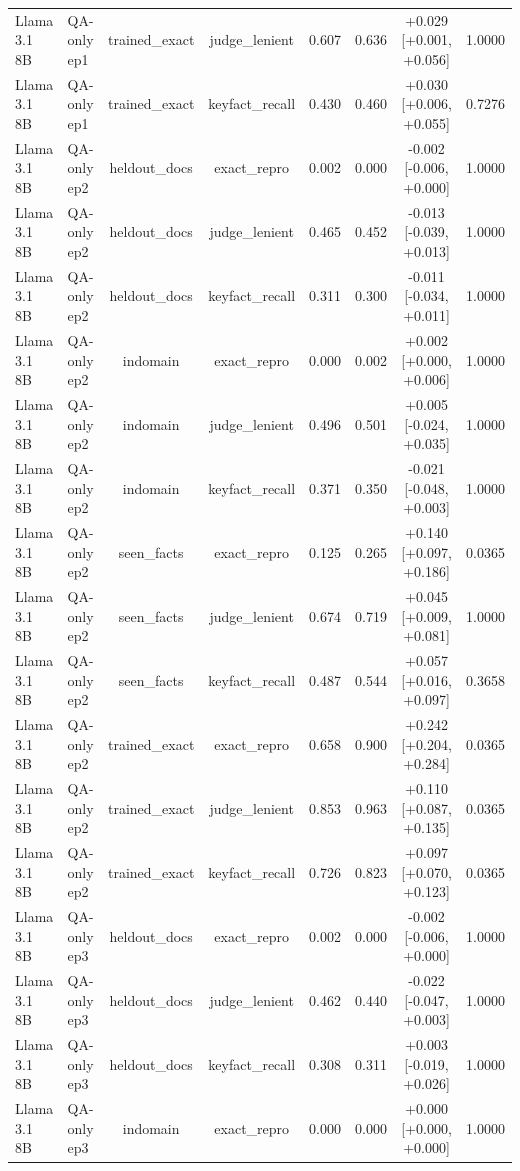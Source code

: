 \begin{table}[t]
{\begin{tabular}{llcccccc}
Llama 3.1 8B & QA-only ep1 & trained\_exact & judge\_lenient & 0.607 & 0.636 & +0.029 [+0.001, +0.056] & 1.0000 \\
Llama 3.1 8B & QA-only ep1 & trained\_exact & keyfact\_recall & 0.430 & 0.460 & +0.030 [+0.006, +0.055] & 0.7276 \\
Llama 3.1 8B & QA-only ep2 & heldout\_docs & exact\_repro & 0.002 & 0.000 & -0.002 [-0.006, +0.000] & 1.0000 \\
Llama 3.1 8B & QA-only ep2 & heldout\_docs & judge\_lenient & 0.465 & 0.452 & -0.013 [-0.039, +0.013] & 1.0000 \\
Llama 3.1 8B & QA-only ep2 & heldout\_docs & keyfact\_recall & 0.311 & 0.300 & -0.011 [-0.034, +0.011] & 1.0000 \\
Llama 3.1 8B & QA-only ep2 & indomain & exact\_repro & 0.000 & 0.002 & +0.002 [+0.000, +0.006] & 1.0000 \\
Llama 3.1 8B & QA-only ep2 & indomain & judge\_lenient & 0.496 & 0.501 & +0.005 [-0.024, +0.035] & 1.0000 \\
Llama 3.1 8B & QA-only ep2 & indomain & keyfact\_recall & 0.371 & 0.350 & -0.021 [-0.048, +0.003] & 1.0000 \\
Llama 3.1 8B & QA-only ep2 & seen\_facts & exact\_repro & 0.125 & 0.265 & +0.140 [+0.097, +0.186] & 0.0365 \\
Llama 3.1 8B & QA-only ep2 & seen\_facts & judge\_lenient & 0.674 & 0.719 & +0.045 [+0.009, +0.081] & 1.0000 \\
Llama 3.1 8B & QA-only ep2 & seen\_facts & keyfact\_recall & 0.487 & 0.544 & +0.057 [+0.016, +0.097] & 0.3658 \\
Llama 3.1 8B & QA-only ep2 & trained\_exact & exact\_repro & 0.658 & 0.900 & +0.242 [+0.204, +0.284] & 0.0365 \\
Llama 3.1 8B & QA-only ep2 & trained\_exact & judge\_lenient & 0.853 & 0.963 & +0.110 [+0.087, +0.135] & 0.0365 \\
Llama 3.1 8B & QA-only ep2 & trained\_exact & keyfact\_recall & 0.726 & 0.823 & +0.097 [+0.070, +0.123] & 0.0365 \\
Llama 3.1 8B & QA-only ep3 & heldout\_docs & exact\_repro & 0.002 & 0.000 & -0.002 [-0.006, +0.000] & 1.0000 \\
Llama 3.1 8B & QA-only ep3 & heldout\_docs & judge\_lenient & 0.462 & 0.440 & -0.022 [-0.047, +0.003] & 1.0000 \\
Llama 3.1 8B & QA-only ep3 & heldout\_docs & keyfact\_recall & 0.308 & 0.311 & +0.003 [-0.019, +0.026] & 1.0000 \\
Llama 3.1 8B & QA-only ep3 & indomain & exact\_repro & 0.000 & 0.000 & +0.000 [+0.000, +0.000] & 1.0000 \\

\end{tabular}}
\end{table}
